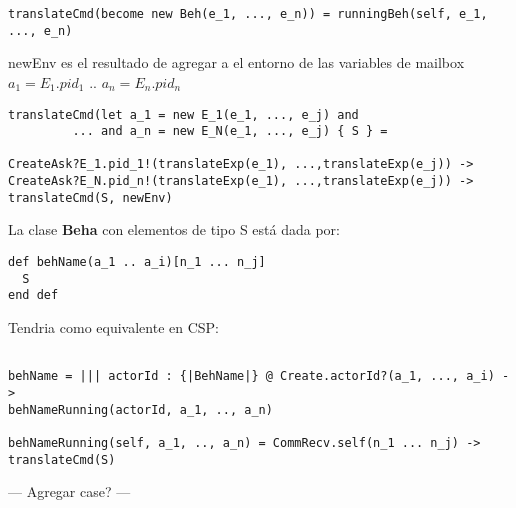 \documentclass[fleqn]{article}
\begin{document}
\begin{verbatim}
translateCmd(become new Beh(e_1, ..., e_n)) = runningBeh(self, e_1, ..., e_n)
\end{verbatim}

newEnv es el resultado de agregar a el entorno de las variables de mailbox $a_1
= E_1.pid_1$ .. $a_n = E_n.pid_n$
\begin{verbatim}
translateCmd(let a_1 = new E_1(e_1, ..., e_j) and 
         ... and a_n = new E_N(e_1, ..., e_j) { S } = 

CreateAsk?E_1.pid_1!(translateExp(e_1), ...,translateExp(e_j)) ->
CreateAsk?E_N.pid_n!(translateExp(e_1), ...,translateExp(e_j)) ->
translateCmd(S, newEnv)
\end{verbatim}


La clase \textbf{Beha} con elementos de tipo S está dada por:

\begin{verbatim}
def behName(a_1 .. a_i)[n_1 ... n_j]
  S
end def
\end{verbatim}

Tendria como equivalente en CSP:

\begin{verbatim}

behName = ||| actorId : {|BehName|} @ Create.actorId?(a_1, ..., a_i) ->
behNameRunning(actorId, a_1, .., a_n)

behNameRunning(self, a_1, .., a_n) = CommRecv.self(n_1 ... n_j) -> translateCmd(S)

\end{verbatim}

--- Agregar case? ---

{}

\end{document}
